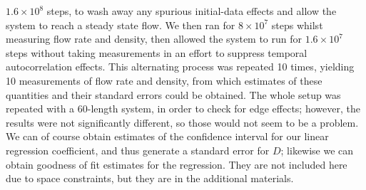 $1.6\times10^8$ steps, to wash away any spurious initial-data effects and allow the system to reach a steady state flow. We then ran for $8\times10^7$ steps whilst measuring flow rate and density, then allowed the system to run for $1.6\times10^7$
steps without taking measurements in an effort to suppress temporal autocorrelation effects. This alternating process was repeated 10 times, yielding 10 measurements of flow rate and density, from which estimates of these quantities and their
standard errors could be obtained. The whole setup was repeated with a 60-length system, in order to check for edge effects; however, the results were not significantly different, so those would not seem to be a problem.
We can of course obtain estimates of the confidence interval for our linear regression coefficient, and thus generate a standard error for $D$; likewise we can obtain goodness of fit estimates for the
regression. They are not included here due to space constraints, but they are in the additional materials.


